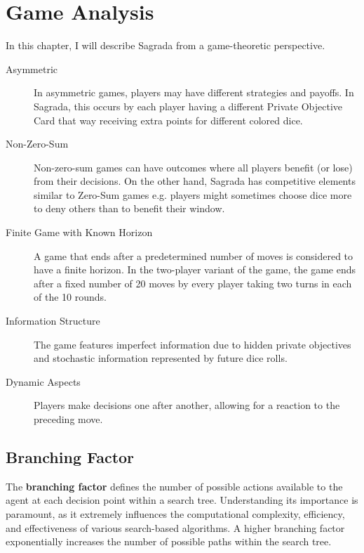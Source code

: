 \chapter{Game Analysis}

In this chapter, I will describe Sagrada from a game-theoretic perspective. 


\begin{description}
    \item[Asymmetric] In asymmetric games, players may have different strategies and payoffs. In Sagrada, this occurs by each player having
    a different Private Objective Card that way receiving extra points for different colored dice.
    
    \item[Non-Zero-Sum] Non-zero-sum games can have outcomes where all players benefit (or lose) from their decisions. On the other hand, Sagrada
    has competitive elements similar to Zero-Sum games e.g. players might sometimes choose dice more to deny others than to benefit their window.
    
    \item[Finite Game with Known Horizon] A game that ends after a predetermined number of moves is considered to have a finite horizon. In the two-player 
    variant of the game, the game ends after a fixed number of 20 moves by every player taking two turns in each of the 10 rounds.
    
    \item[Information Structure] The game features imperfect information due to hidden private objectives and stochastic information represented by future dice rolls.
    
    \item[Dynamic Aspects] Players make decisions one after another, allowing for a reaction to the preceding move.
\end{description}


\section{Branching Factor}

The \textbf{branching factor} defines the number of possible actions available to the agent at 
each decision point within a search tree. Understanding its importance is paramount, as it extremely influences the computational complexity, efficiency, 
and effectiveness of various search-based algorithms. A higher branching factor exponentially increases the number of possible paths within the search tree.

